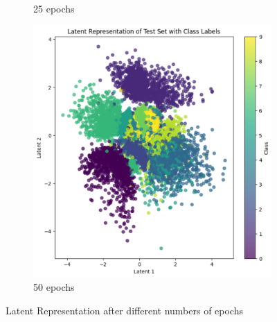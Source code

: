 \begin{figure}[H]
\begin{subfigure}[b]{0.45\textwidth}
        \caption{25 epochs}
        \label{fig:latentRep25}
    \end{subfigure}
    \begin{subfigure}[b]{0.45\textwidth}
        \centering
        \includegraphics[width=\textwidth]{images/3-latentRep50.png}
        \caption{50 epochs}
        \label{fig:latentRep50}
    \end{subfigure}
    \caption{Latent Representation after different numbers of epochs}
    \label{fig:latentRep}
\end{figure}

